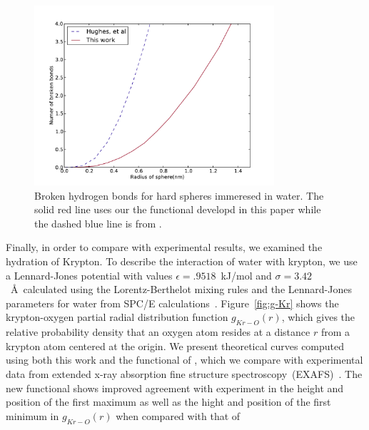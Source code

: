 \begin{figure}
\begin{center}
\includegraphics[width=3.5in]{figs/sphere-broken-HB}
\end{center}
\caption{Broken hydrogen bonds for hard spheres immeresed in water.
  The solid red line uses our the functional developd in this paper
  while the dashed blue line is from
  \hughesetal.}
\label{fig:spheres-broken-HB}
\end{figure}

Finally, in order to compare with experimental results, we examined
the hydration of Krypton.  To describe the interaction of water with
krypton, we use a Lennard-Jones potential with values $\epsilon =
.9518$~kJ/mol and $\sigma = 3.42$~\AA\ calculated using the
Lorentz-Berthelot mixing rules and the Lennard-Jones parameters for
water from SPC/E
calculations~\cite{paschek2004temperature}. Figure~\ref{fig:g-Kr}
shows the krypton-oxygen partial radial distribution function
$g_{Kr-O}(r)$, which gives the relative probability density that an
oxygen atom resides at a distance $r$ from a krypton atom centered at
the origin.  We present theoretical curves computed using both this
work and the functional of \hughesetal, which we compare with
experimental data from extended x-ray absorption fine structure
spectroscopy~(EXAFS)~\cite{bowron1998hydrophobic}.  The new functional
shows improved agreement with experiment in the height and position
of the first maximum as well as the hight and position of the first
minimum in $g_{Kr-O}(r)$ when compared with that of \hughesetal \



